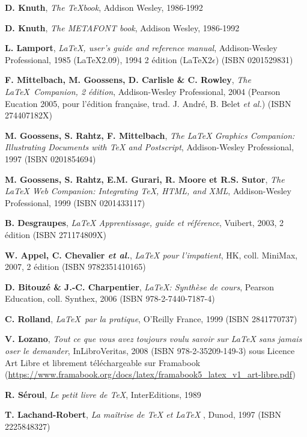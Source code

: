 \begin{thebibliography}{xx}
\textbf{D. Knuth}, \textsl{The \TeX book}, Addison Wesley, 1986-1992

\textbf{D. Knuth}, \textsl{The METAFONT book}, Addison Wesley, 1986-1992

\textbf{L. Lamport}, \textsl{\LaTeX, user's guide and
reference manual}, Addison-Wesley Professional, 1985 (\LaTeX 2.09), 1994 2\ieme{} édition (\LaTeX 2$\epsilon$) (ISBN 0201529831)

\textbf{F. Mittelbach, M. Goossens, D. Carlisle \& C. Rowley}, \textsl{The \LaTeX\ Companion, 2\ieme{} édition}, Addison-Wesley Professional, 2004 (Pearson Eucation 2005, pour l'édition française, trad. J. André, B. Belet \emph{et al.}) (ISBN 274407182X)

\textbf{M. Goossens, S. Rahtz, F. Mittelbach}, \textsl{ The {\LaTeX} Graphics Companion: Illustrating Documents with TeX and Postscript}, Addison-Wesley Professional, 1997 (ISBN 0201854694)

\textbf{M. Goossens, S. Rahtz, E.M. Gurari, R. Moore et R.S. Sutor}, \textsl{The {\LaTeX} Web Companion: Integrating TeX, HTML, and XML}, Addison-Wesley Professional, 1999 (ISBN 0201433117)

\textbf{B. Desgraupes}, \textsl{{\LaTeX} Apprentissage, guide et référence}, Vuibert, 2003, 2\ieme{} édition (ISBN 271174809X)

\textbf{W. Appel, C. Chevalier \emph{et al.}}, \textsl{{\LaTeX} pour l'impatient}, HK, coll. MiniMax, 2007, 2\ieme{} édition (ISBN 9782351410165)

\textbf{D. Bitouzé \& J.-C. Charpentier}, \textsl{\LaTeX: Synthèse de cours}, Pearson Education, coll. Synthex, 2006 (ISBN 978-2-7440-7187-4)

\textbf{C. Rolland}, \textsl{\LaTeX\ par la pratique}, O'Reilly France, 1999 (ISBN 2841770737)

\textbf{V. Lozano}, \textsl{Tout ce que vous avez toujours voulu savoir sur {\LaTeX} sans jamais oser le demander}, InLibroVeritas, 2008 (ISBN 978-2-35209-149-3) sous Licence Art Libre et librement téléchargeable sur Framabook (\url{https://www.framabook.org/docs/latex/framabook5_latex_v1_art-libre.pdf})

\textbf{R. Séroul}, \textsl{Le petit livre de \TeX}, InterEditions, 1989

\textbf{T. Lachand-Robert}, \textsl{La maîtrise de {\TeX} et {\LaTeX}} , Dunod, 1997 (ISBN 2225848327)


\end{thebibliography}
